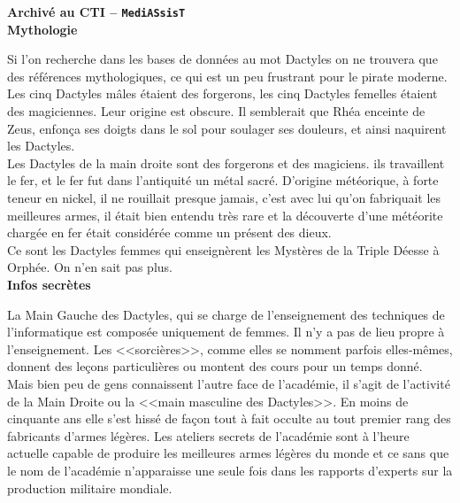 \documentclass[11pt,twoside,a4paper]{article}
\begin{document}
\begin{multicols}{3}
{\textbf{Archiv{\'e} au CTI -- \texttt{MediASsisT} }~\\

\textbf{Mythologie}

Si l'on recherche dans les bases de donn{\'e}es au mot Dactyles on ne trouvera que des r{\'e}f{\'e}rences mythologiques, ce qui est un peu frustrant pour le pirate moderne.                                  
Les cinq Dactyles m{\^a}les {\'e}taient des forgerons, les cinq Dactyles femelles {\'e}taient des magiciennes. Leur origine est obscure. Il semblerait que Rh{\'e}a enceinte de Zeus, enfon\c{c}a ses doigts dans le sol pour soulager ses douleurs, et ainsi naquirent les Dactyles.~\\

Les Dactyles de la main droite sont des forgerons et des magiciens. ils travaillent le fer, et le fer fut dans l'antiquit{\'e} un m{\'e}tal sacr{\'e}. D'origine m{\'e}t{\'e}orique, {\`a} forte teneur en nickel, il ne rouillait presque jamais, c'est avec lui qu'on fabriquait les meilleures armes, il {\'e}tait bien entendu tr{\`e}s rare et la d{\'e}couverte d'une m{\'e}t{\'e}orite charg{\'e}e en fer {\'e}tait consid{\'e}r{\'e}e comme un pr{\'e}sent des dieux.~\\

Ce sont les Dactyles femmes qui enseign{\`e}rent les Myst{\`e}res de la Triple D{\'e}esse {\`a} Orph{\'e}e. On n'en sait pas plus.~\\

\textbf{Infos secr{\`e}tes}

La Main Gauche des Dactyles, qui se charge de l'enseignement des techniques de l'informatique est compos{\'e}e uniquement de femmes. Il n'y a pas de lieu propre {\`a} l'enseignement. Les <<sorci{\`e}res>>, comme elles se nomment parfois elles-m{\^e}mes, donnent des le\c{c}ons particuli{\`e}res ou montent des cours pour un temps donn{\'e}.~\\

Mais bien peu de gens connaissent l'autre face de l'acad{\'e}mie, il s'agit de l'activit{\'e} de la Main Droite ou la <<main masculine des Dactyles>>. En moins de cinquante ans elle s'est hiss{\'e} de fa\c{c}on tout {\`a} fait occulte au tout premier rang des fabricants d'armes l{\'e}g{\`e}res. Les ateliers secrets de l'acad{\'e}mie sont {\`a} l'heure actuelle capable de produire les meilleures armes l{\'e}g{\`e}res du monde et ce sans que le nom de l'acad{\'e}mie n'apparaisse une seule fois dans les rapports d'experts sur la production militaire mondiale.~\\

}
\end{multicols}
\end{document}
